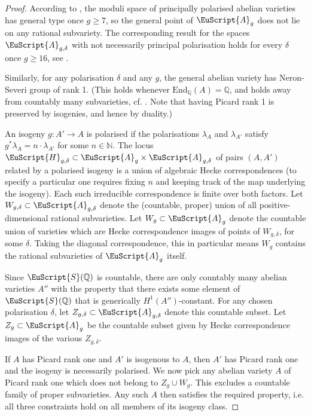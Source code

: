 \documentclass[11pt]{amsart}
\newcommand{\scrH}{\EuScript{H}}
\newcommand{\scrA}{\EuScript{A}}
\newcommand{\scrS}{\EuScript{S}}
\newcommand{\bQ}{\mathbb{Q}}
\newcommand{\bN}{\mathbb{N}}
\numberwithin{equation}{section}
\renewcommand{\geq}{\geqslant}
\begin{document}
\begin{proof}
	According to \cite{mumford2006kodaira}, the moduli space of principally polarised abelian varieties has general type once $g\geq 7$, so the general point of $\scrA_g$ does not lie on any rational subvariety. The corresponding result for the spaces $\scrA_{g,\delta}$ with not necessarily principal polarisation holds for every $\delta$ once $g \geq 16$, see \cite{Tai}.

	Similarly, for any polarisation $\delta$ and any $g$, the general abelian variety has Neron-Severi group of rank 1. (This holds whenever $\mathrm{End}_{\bQ}(A) = \bQ$, and holds away from countably many subvarieties, cf. \cite[Chapters 5,9]{BL}. Note that having Picard rank 1 is preserved by isogenies, and hence by duality.)



	An isogeny $g: A' \to A$ is polarised if the polarisations $\lambda_A$ and $\lambda_{A'}$ satisfy $g^*\lambda_A = n\cdot \lambda_{A'}$ for some $n\in\bN$. The locus $\scrH_{g,\delta} \subset \scrA_g \times \scrA_{g,\delta}$ of pairs $(A,A')$ related by a polarised isogeny is a union of algebraic Hecke correspondences \cite[Lemma 4.2]{Orr} (to specify a particular one requires fixing $n$ and keeping track of the map underlying the isogeny). Each such irreducible correspondence is finite over both factors. Let $W_{g,\delta} \subset \scrA_{g,\delta}$ denote the (countable, proper) union of all positive-dimensional rational subvarieties. Let $W_g \subset \scrA_g$ denote the countable union of varieties which are Hecke correspondence images of points of $W_{g,\delta}$, for some $\delta$. Taking the diagonal correspondence, this in particular means $W_g$ contains the rational subvarieties of $\scrA_g$ itself.


	Since $\scrS(\bQ)$ is countable, there are only countably many abelian varieties $A''$ with the property that there exists some element of $\scrS(\bQ)$ that is generically $H^1(A'')$-constant.
	For any chosen polarisation $\delta$, let $Z_{g,\delta} \subset \scrA_{g,\delta}$ denote this countable subset. Let $Z_g \subset \scrA_g$ be the countable subset given by Hecke correspondence images of the various $Z_{g,\delta}$.

	If $A$ has Picard rank one and $A'$ is isogenous to $A$, then $A'$ has Picard rank one and the isogeny is necessarily polarised. We now pick any abelian variety $A$ of Picard rank one  which does not belong to $Z_g \cup W_g$.  This excludes a countable family of proper subvarieties. Any such $A$ then satisfies the required property, i.e. all three constraints hold on all members of its isogeny class.
\end{proof}
\end{document}
